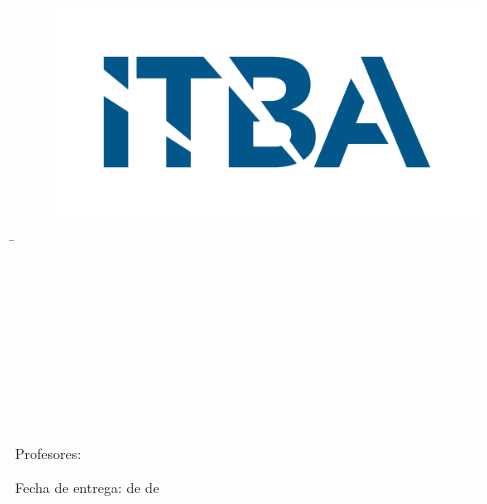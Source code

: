 

\begin{titlepage}
    \begin{figure}[t!]
    \centering
    \includegraphics[scale=0.1]{Imagenes/LOGO ITBA.png}
    \end{figure}
    
    \centering
    {\large{\the\materia}\par}
    \vspace{0.3cm}
    {\bfseries\Huge{\the\titulo}\par}
    \vspace{0.5cm}
    {\huge{\the\nombreTP}\par}
    \vspace{.5cm}
    {\large{\the\grupo}\par}
    \vspace{2cm}
    {\large{ \slshape
    \begin{tabbing}

        \the\nomEstudianteA \quad\quad\quad\= \the\legajoEstudianteA \quad\quad\= \href{mailto:	\the\mailEstudianteA}{\texttt{\the\mailEstudianteA}} \\
        \\
        \the\nomEstudianteB \> \the\legajoEstudianteB \> \href{mailto:	\the\mailEstudianteA}{\texttt{\the\mailEstudianteB}} \\\\
        \the\nomEstudianteC \> \the\legajoEstudianteC \> \href{mailto:	\the\mailEstudianteA}{\texttt{\the\mailEstudianteC}}\\\\
        \the\nomEstudianteD \> \the\legajoEstudianteD \> \href{mailto:	\the\mailEstudianteA}{\texttt{\the\mailEstudianteD}}\\\\
        \the\nomEstudianteE \> \the\legajoEstudianteE \> \href{mailto:	\the\mailEstudianteA}{\texttt{\the\mailEstudianteE}}\\\\
    \end{tabbing}
    }\par}
 
    \vspace{4cm}
    {\large{Profesores: \the\profesores}\par}
    {\large{Fecha de entrega: \the\dia \space de \the\mes \space de \the\ano}\par}
    
\end{titlepage}